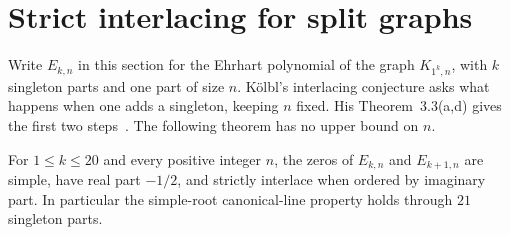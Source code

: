 \section{Strict interlacing for split graphs}\label{sec:interlacing}

Write $E_{k,n}$ in this section for the Ehrhart polynomial of the graph
$K_{1^k,n}$, with $k$ singleton parts and one part of size $n$.
K\"olbl's interlacing conjecture asks what happens when one adds a
singleton, keeping $n$ fixed. His Theorem~3.3(a,d) gives the first two
steps~\cite{kolbl}. The following theorem has no upper bound on $n$.

\begin{theorem}\label{thm:split}
For $1\le k\le20$ and every positive integer $n$, the zeros of
$E_{k,n}$ and $E_{k+1,n}$ are simple, have real part $-1/2$, and strictly
interlace when ordered by imaginary part. In particular the simple-root
canonical-line property holds through $21$ singleton parts.
\end{theorem}

